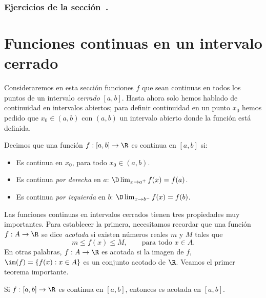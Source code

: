 \subsubsection*{Ejercicios de la sección~.}

\begin{enumerate}

\end{enumerate}


    
\section{Funciones continuas en un intervalo cerrado}

Consideraremos en esta sección funciones $f$ que sean continuas en todos los puntos de un intervalo \emph{cerrado} $[a,b]$.
Hasta ahora solo hemos hablado de continuidad en intervalos abiertos; para definir continuidad en un punto $x_0$ hemos pedido que $x_0\in(a,b)$ con $(a,b)$ un intervalo abierto donde la función está definida.

\begin{definition}
Decimos que una función $f:[a,b]\to\R$ es continua en $[a,b]$ si:
\begin{itemize}
    \item Es continua en $x_0$, para todo $x_0\in(a,b)$.
    \item Es continua \emph{por derecha} en $a$: $\D\lim_{x\to a^+}f(x)=f(a)$.
    \item Es continua \emph{por izquierda} en $b$: $\D\lim_{x\to b^-}f(x)=f(b)$.
\end{itemize}
\end{definition}

Las funciones continuas en intervalos cerrados tienen tres propiedades muy importantes. Para establecer la primera, necesitamos recordar que una función $f:A\to\R$ se dice \emph{acotada} si existen números reales $m$ y $M$ tales que 
\[
m\le f(x) \le M, \qquad\text{para todo $x\in A$}.
\]
En otras palabras, $f:A\to\R$ es acotada si la imagen de $f$, $\im(f)=\{f(x):x\in A\}$ es un conjunto acotado de $\R$.
Veamos el primer teorema importante.

\begin{theorem}\label{T:continua->acotada}
    Si $f:[a,b]\to\R$ es continua en $[a,b]$, entonces es acotada en $[a,b]$.
\end{theorem}

